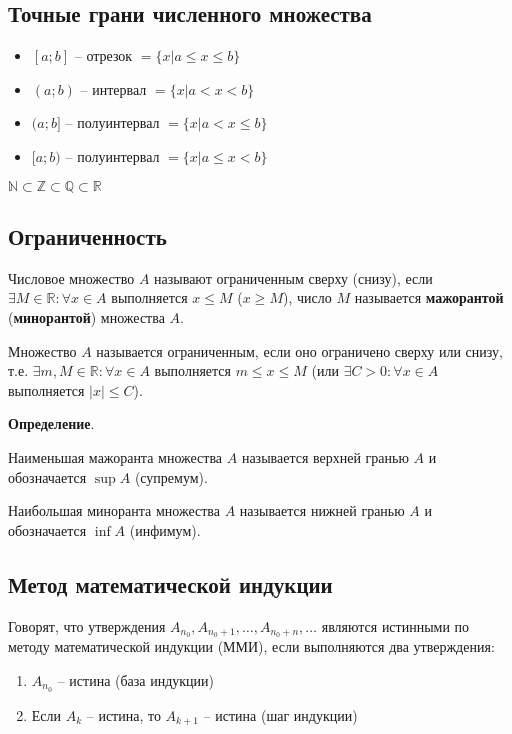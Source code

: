 \documentclass{article}
\newcommand{\parspace}{\vspace{10pt}}
\begin{document}
\subsection{Точные грани численного множества}

\begin{itemize}
    \item $[a;b]$ -- отрезок $= \{x | a \le x \le b\}$
    \item $(a;b)$ -- интервал $= \{x | a < x < b\}$
    \item $(a;b]$ -- полуинтервал $= \{x | a < x \le b\}$
    \item $[a;b)$ -- полуинтервал $= \{x | a \le x < b\}$
\end{itemize}

$\mathbb{N} \subset \mathbb{Z} \subset \mathbb{Q} \subset \mathbb{R}$

\subsection{Ограниченность}

Числовое множество $A$ называют ограниченным сверху (снизу), если 
$\exists M \in \mathbb{R}: \forall x \in A$ выполняется $x \le M$ ($x \ge M$),
число $M$ называется \textbf{мажорантой} (\textbf{минорантой}) множества $A$.

Множество $A$ называется ограниченным, если оно ограничено сверху или снизу,
т.е. $\exists m, M \in \mathbb{R}: \forall x \in A$ выполняется $m \le x \le M$
(или $\exists C > 0: \forall x \in A$ выполняется $|x| \le C$).

\parspace

\textbf{Определение}.

Наименьшая мажоранта множества $A$ называется верхней гранью $A$ и обозначается
$\sup A$ (супремум).

Наибольшая миноранта множества $A$ называется нижней гранью $A$ и обозначается
$\inf A$ (инфимум).

\subsection{Метод математической индукции}

Говорят, что утверждения $A_{n_0}, A_{n_0 + 1}, \dots, A_{n_0 + n}, \dots$ являются
истинными по методу математической индукции (ММИ), если выполняются два утверждения:
\begin{enumerate}
    \item $A_{n_0}$ -- истина (база индукции)
    \item Если $A_k$ -- истина, то $A_{k+1}$ -- истина (шаг индукции)
\end{enumerate}
\end{document}
